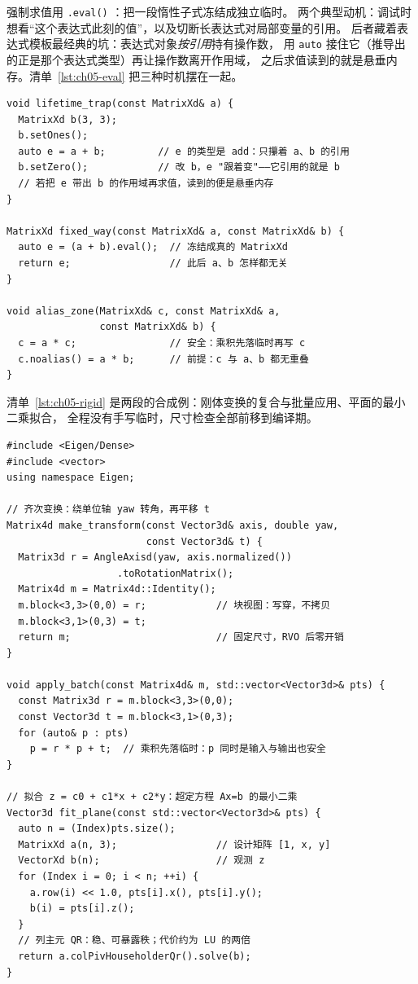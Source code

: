 \documentclass[12pt,a4paper,fontset=fandol]{ctexbook}
\newcommand{\Tp}[1]{\texttt{#1}}
\newcommand{\Bk}{\allowbreak}
\begin{document}
强制求值用 \Tp{.eval()} \Bk{}：把一段惰性子式冻结成独立临时。
两个典型动机：调试时想看``这个表达式此刻的值''，以及切断长表达式对局部变量的引用。
后者藏着表达式模板最经典的坑：表达式对象\emph{按引用}持有操作数，
用 \Tp{auto} \Bk{} 接住它（推导出的正是那个表达式类型）再让操作数离开作用域，
之后求值读到的就是悬垂内存。清单~\ref{lst:ch05-eval} 把三种时机摆在一起。

\begin{lstlisting}[style=cppstyle,caption={惰性、求值与生命周期：\Tp{auto} 接表达式是个真问题},label={lst:ch05-eval}]
void lifetime_trap(const MatrixXd& a) {
  MatrixXd b(3, 3);
  b.setOnes();
  auto e = a + b;         // e 的类型是 add：只攥着 a、b 的引用
  b.setZero();            // 改 b，e "跟着变"——它引用的就是 b
  // 若把 e 带出 b 的作用域再求值，读到的便是悬垂内存
}

MatrixXd fixed_way(const MatrixXd& a, const MatrixXd& b) {
  auto e = (a + b).eval();  // 冻结成真的 MatrixXd
  return e;                 // 此后 a、b 怎样都无关
}

void alias_zone(MatrixXd& c, const MatrixXd& a,
                const MatrixXd& b) {
  c = a * c;                // 安全：乘积先落临时再写 c
  c.noalias() = a * b;      // 前提：c 与 a、b 都无重叠
}
\end{lstlisting}

清单~\ref{lst:ch05-rigid} 是两段的合成例：刚体变换的复合与批量应用、平面的最小二乘拟合，
全程没有手写临时，尺寸检查全部前移到编译期。

\begin{lstlisting}[style=cppstyle,caption={刚体变换与平面最小二乘：表达式直接写代数式},label={lst:ch05-rigid}]
#include <Eigen/Dense>
#include <vector>
using namespace Eigen;

// 齐次变换：绕单位轴 yaw 转角，再平移 t
Matrix4d make_transform(const Vector3d& axis, double yaw,
                        const Vector3d& t) {
  Matrix3d r = AngleAxisd(yaw, axis.normalized())
                   .toRotationMatrix();
  Matrix4d m = Matrix4d::Identity();
  m.block<3,3>(0,0) = r;            // 块视图：写穿，不拷贝
  m.block<3,1>(0,3) = t;
  return m;                         // 固定尺寸，RVO 后零开销
}

void apply_batch(const Matrix4d& m, std::vector<Vector3d>& pts) {
  const Matrix3d r = m.block<3,3>(0,0);
  const Vector3d t = m.block<3,1>(0,3);
  for (auto& p : pts)
    p = r * p + t;  // 乘积先落临时：p 同时是输入与输出也安全
}

// 拟合 z = c0 + c1*x + c2*y：超定方程 Ax=b 的最小二乘
Vector3d fit_plane(const std::vector<Vector3d>& pts) {
  auto n = (Index)pts.size();
  MatrixXd a(n, 3);                 // 设计矩阵 [1, x, y]
  VectorXd b(n);                    // 观测 z
  for (Index i = 0; i < n; ++i) {
    a.row(i) << 1.0, pts[i].x(), pts[i].y();
    b(i) = pts[i].z();
  }
  // 列主元 QR：稳、可暴露秩；代价约为 LU 的两倍
  return a.colPivHouseholderQr().solve(b);
}
\end{lstlisting}
\end{document}

